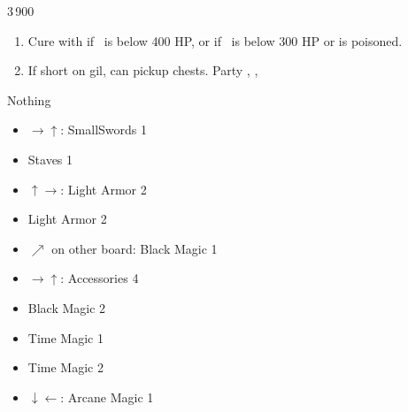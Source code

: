 \begin{shop}{3\,900}
\end{shop}
\begin{enumerate}
	\item Cure with \balthier if \basch\ is below 400 HP, or if \vaan\ is below 300 HP or is poisoned.
	\item If short on gil, can pickup chests. Party \vaan, \penelo, \ashe
\end{enumerate}
\begin{liscense}
\begin{itemize}
	\baschf Nothing
	\ashef \rightb
	\begin{itemize}
		\item $\rightarrow\uparrow$: SmallSwords 1
	\end{itemize}
	\penelof \rightb
	\begin{itemize}
		\item Staves 1
	\end{itemize}
	\vaanf \rightb
	\begin{itemize}
		\item $\uparrow\rightarrow$: Light Armor 2
	\end{itemize}
	\penelof \leftb
	\begin{itemize}
		\item Light Armor 2
		\item $\nearrow$ on other board: Black Magic 1
	\end{itemize}
	\ashef \leftb
	\begin{itemize}
		\item $\rightarrow\uparrow$: Accessories 4
	\end{itemize}
	\penelof \rightb
	\begin{itemize}
		\item Black Magic 2
	\end{itemize}
	\vaanf \rightb
	\begin{itemize}
		\item Time Magic 1
	\end{itemize}
	\penelof \leftb
	\begin{itemize}
		\item Time Magic 2
		\item $\downarrow\leftarrow$: Arcane Magic 1
	\end{itemize}
	\vaanf \rightb

\end{itemize}
\end{liscense}
